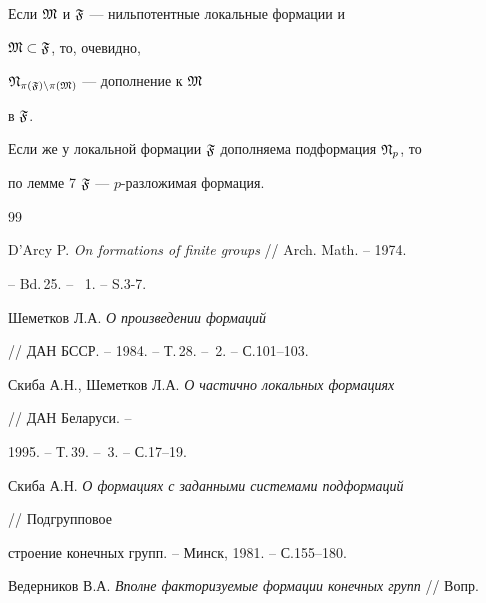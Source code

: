  


\begin{pf} Если $\frak M$ и $\frak F$ --- нильпотентные локальные формации и 


$\frak M\subset\frak F$, то, очевидно, 


$\frak N_{\pi(\frak F)\setminus\pi(\frak M)}$ --- дополнение к $\frak M$ 


в $\frak F$. 


Если же у локальной формации $\frak F$ дополняема подформация $\frak N_p$, то 


по лемме 7 $\frak F$ --- $p$-разложимая формация.


\end{pf} 


 


\begin{thebibliography}{99} 


 




D'Arcy P. {\em On formations of finite groups} // Arch. Math. -- 1974. 


-- Bd.\,25. -- \No\, 1. -- S.3-7. 


 




Шеметков Л.А. {\em О произведении формаций} 


// ДАН БССР. -- 1984. -- Т.\,28. -- \No\,2. -- С.101--103. 


 




Скиба А.Н., Шеметков Л.А. {\em О частично локальных формациях} 


// ДАН Беларуси. -- 


1995. -- Т.\,39. -- \No\,3. -- С.17--19. 


 




Скиба А.Н. {\em О формациях с заданными системами подформаций} 


// Подгрупповое 


строение конечных групп. -- Минск, 1981. -- С.155--180. 


 




Ведерников В.А. {\em Вполне факторизуемые формации конечных групп} // Вопр. 



\end{thebibliography}
